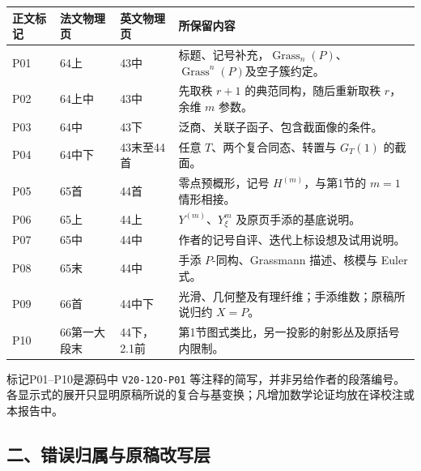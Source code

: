 \documentclass[UTF8,a4paper]{ctexbook}
\begin{document}
\begin{longtable}{@{}p{.12\linewidth}p{.16\linewidth}p{.16\linewidth}p{.44\linewidth}@{}}
\toprule
正文标记 & 法文物理页 & 英文物理页 & 所保留内容\\
\midrule
\endhead
P01 & 64上 & 43中 & 标题、记号补充，$\operatorname{Grass}_n(P)$、$\operatorname{Grass}^n(P)$及空子簇约定。\\
P02 & 64上中 & 43中 & 先取秩 $r+1$ 的典范同构，随后重新取秩 $r$，余维 $m$ 参数。\\
P03 & 64中 & 43下 & 泛商、关联子函子、包含截面像的条件。\\
P04 & 64中下 & 43末至44首 & 任意 $T$、两个复合同态、转置与 $G_T(1)$ 的截面。\\
P05 & 65首 & 44首 & 零点预概形，记号 $H^{(m)}$，与第1节的 $m=1$ 情形相接。\\
P06 & 65上 & 44上 & $Y^{(m)}$、$Y^m_\xi$ 及原页手添的基底说明。\\
P07 & 65中 & 44中 & 作者的记号自评、迭代上标设想及试用说明。\\
P08 & 65末 & 44中 & 手添 $P$-同构、Grassmann 描述、核模与 Euler 式。\\
P09 & 66首 & 44中下 & 光滑、几何整及有理纤维；手添维数；原稿所说归约 $X=P$。\\
P10 & 66第一大段末 & 44下，2.1前 & 第1节图式类比，另一投影的射影丛及原括号内限制。\\
\bottomrule
\end{longtable}

标记P01--P10是源码中 \texttt{V20-12O-P01} 等注释的简写，并非另给作者的段落编号。各显示式的展开只显明原稿所说的复合与基变换；凡增加数学论证均放在译校注或本报告中。

\subsection*{二、错误归属与原稿改写层}
\end{document}
